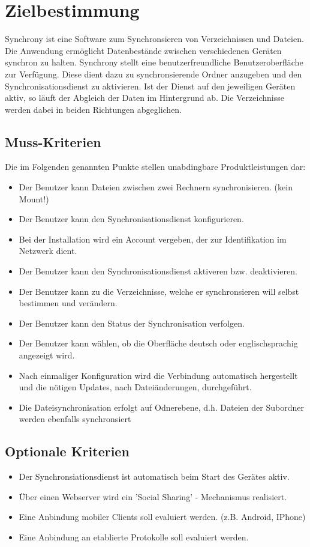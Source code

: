 \documentclass[12pt,oneside,a4paper,bibtotoc,liststotoc,pointlessnumbers]{scrartcl}
\begin{document}

\section{Zielbestimmung}
Synchrony ist eine Software zum Synchronsieren von Verzeichnissen und Dateien.
Die Anwendung ermöglicht Datenbestände zwischen verschiedenen Geräten synchron zu halten.
Synchrony stellt eine benutzerfreundliche Benutzeroberfläche zur Verfügung. Diese dient dazu
zu synchronsierende Ordner anzugeben und den Synchronisationsdienst zu aktivieren. Ist der Dienst auf
den jeweiligen Geräten aktiv, so läuft der Abgleich der Daten im Hintergrund ab. Die Verzeichnisse 
werden dabei in beiden Richtungen abgeglichen.
\subsection{Muss-Kriterien}
Die im Folgenden genannten Punkte stellen unabdingbare Produktleistungen dar:
\begin{itemize}
\item Der Benutzer kann Dateien zwischen zwei Rechnern synchronisieren. (kein Mount!)
\item Der Benutzer kann den Synchronisationsdienst konfigurieren.
\item Bei der Installation wird ein Account vergeben, der zur Identifikation im Netzwerk dient.
\item Der Benutzer kann den Synchronisationsdienst aktiveren bzw. deaktivieren.
\item Der Benutzer kann zu die Verzeichnisse, welche er synchronsieren will selbst bestimmen und verändern.
\item Der Benutzer kann den Status der Synchronisation verfolgen.
\item Der Benutzer kann wählen, ob die Oberfläche deutsch oder englischsprachig angezeigt wird.
\item Nach einmaliger Konfiguration wird die Verbindung automatisch hergestellt und die  
  nötigen Updates, nach Dateiänderungen, durchgeführt.
\item Die Dateisynchronisation erfolgt auf Odnerebene, d.h. Dateien der Subordner werden ebenfalls
  synchronsiert
\end{itemize}
\subsection{Optionale Kriterien}
\begin{itemize}
\item Der Synchronsiationsdienst ist automatisch beim Start des Gerätes aktiv.
\item Über einen Webserver wird ein ’Social Sharing’ - Mechanismus realisiert.
\item Eine Anbindung mobiler Clients soll evaluiert werden. (z.B. Android, IPhone)
\item Eine Anbindung an etablierte Protokolle soll evaluiert werden.
\end{itemize}
\end{document}
